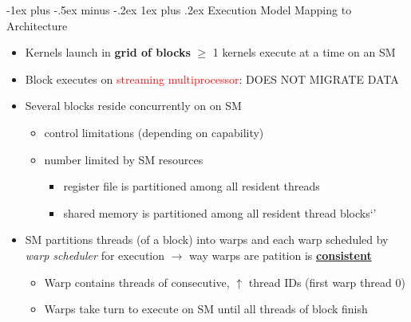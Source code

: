 \documentclass[10pt,landscape]{article}
\makeatletter
\newcommand{\subsubsubsection}{\@startsection{subsubsection}{3}{0mm}%
                                {-1ex plus -.5ex minus -.2ex}%
                                {1ex plus .2ex}%
                                {\normalfont\scriptsize\bfseries}}
\makeatother
\begin{document}
\begin{multicols*}{3}
\subsubsubsection{Execution Model Mapping to Architecture}
\begin{itemize}[topsep=0pt,noitemsep,wide=0pt, leftmargin=\dimexpr{} + 2\relax]
    \item Kernels launch in \textbf{grid of blocks} $\geq$ 1 kernels execute at a time on an SM
    \item Block executes on \textcolor{red}{streaming multiprocessor}: DOES NOT MIGRATE DATA
    \item Several blocks reside concurrently on on SM 
    \begin{itemize}[topsep=0pt,noitemsep,wide=0pt, leftmargin=\dimexpr{} + 2\relax]
        \item control limitations (depending on capability)
        \item number limited by SM resources
        \begin{itemize}[topsep=0pt,noitemsep,wide=0pt, leftmargin=\dimexpr{} + 2\relax]
            \item register file is partitioned among all resident threads
            \item shared memory is partitioned among all resident thread blocks`'
        \end{itemize}
    \end{itemize}
    \item SM partitions threads (of a block) into warps and each warp scheduled by \textit{warp scheduler} for execution $\rightarrow$  way warps are patition is \textbf{\underline{consistent}}
    \begin{itemize}[topsep=0pt,noitemsep,wide=0pt, leftmargin=\dimexpr{} + 2\relax]
        \item Warp contains threads of consecutive, $\uparrow$ thread IDs (first warp thread 0)
        \item Warps take turn to execute on SM until all threads of block finish
    \end{itemize}
\end{itemize}


\end{multicols*}
\end{document}

